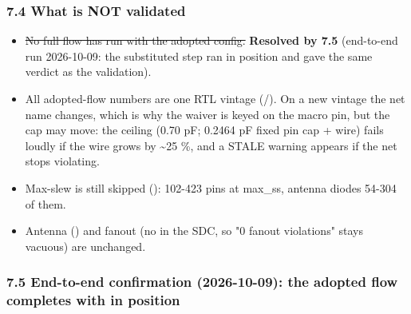 \subsubsection{7.4 What is NOT validated}\label{cr:defect:sky130-slew-cap-e45j:74-what-is-not-validated}

\begin{record}

\begin{itemize}
\tightlist
\item
  \sout{No full flow has run with the adopted config.} \textbf{Resolved
  by 7.5} (end-to-end run 2026-10-09: the substituted step ran in
  position and gave the same verdict as the  validation).
\item
  All adopted-flow numbers are one RTL vintage
  (/). On a new vintage the net name
  changes, which is why the waiver is keyed on the macro pin, but the
  cap may move: the ceiling (0.70 pF; 0.2464 pF fixed pin cap + wire)
  fails loudly if the wire grows by \textasciitilde25 \%, and a STALE
  warning appears if the net stops violating.
\item
  Max-slew is still skipped (): 102-423
  pins at max\_ss, antenna diodes 54-304 of them.
\item
  Antenna () and fanout (no
   in the SDC, so "0 fanout violations" stays
  vacuous) are unchanged.
\end{itemize}

\end{record}

\subsubsection{\texorpdfstring{7.5 End-to-end confirmation (2026-10-09):
the adopted flow completes with  in
position}{7.5 End-to-end confirmation (2026-10-09): the adopted flow completes with  in position}}\label{cr:defect:sky130-slew-cap-e45j:75-end-to-end-confirmation-2026-10-09-the-adopted-flow-completes-with-cvtmaxcapviolations-in-position}

